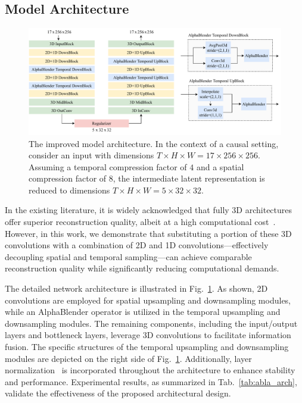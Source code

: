 \documentclass{article} %
\begin{document}
\subsection{Model Architecture}
\label{sec:arch}

\begin{figure}[t]
  \centering
  \includegraphics[width=0.95\linewidth]{imgs/arch.pdf}
  \caption{The improved model architecture. In the context of a causal setting, consider an input with dimensions $T \times H \times W = 17 \times 256 \times 256$. Assuming a temporal compression factor of $4$ and a spatial compression factor of $8$, the intermediate latent representation is reduced to dimensions $T \times H \times W = 5 \times 32 \times 32$.}
  \label{fig:arch}
\end{figure}

In the existing literature, it is widely acknowledged that fully 3D architectures offer superior reconstruction quality, albeit at a high computational cost~\citep{chen2024od}. However, in this work, we demonstrate that substituting a portion of these 3D convolutions with a combination of 2D and 1D convolutions—effectively decoupling spatial and temporal sampling—can achieve comparable reconstruction quality while significantly reducing computational demands.

The detailed network architecture is illustrated in Fig.~\ref{fig:arch}. As shown, 2D convolutions are employed for spatial upsampling and downsampling modules, while an AlphaBlender operator is utilized in the temporal upsampling and downsampling modules. The remaining components, including the input/output layers and bottleneck layers, leverage 3D convolutions to facilitate information fusion. The specific structures of the temporal upsampling and downsampling modules are depicted on the right side of Fig.~\ref{fig:arch}. Additionally, layer normalization~\citep{lei2016layer} is incorporated throughout the architecture to enhance stability and performance. Experimental results, as summarized in Tab.~\ref{tab:abla_arch}, validate the effectiveness of the proposed architectural design.
\end{document}
